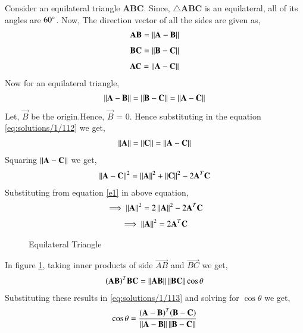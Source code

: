 Consider an equilateral triangle \textbf{ABC}. Since, $\triangle$\textbf{ABC} is an equilateral, all of its angles are $60\degree$. Now, The direction vector of all the sides are given as,
\begin{align}
\mathbf{AB}=\left\lVert\mathbf{A-B}\right\rVert
\end{align}
\begin{align}
\mathbf{BC}=\left\lVert\mathbf{B-C}\right\rVert
\end{align}  
\begin{align}
\mathbf{AC}=\left\lVert\mathbf{A-C}\right\rVert
\end{align} 
Now for an equilateral triangle,
\begin{align}
\left\lVert\mathbf{A-B}\right\rVert = \left\lVert\mathbf{B-C}\right\rVert = \left\lVert\mathbf{A-C}\right\rVert
\label{eq:solutions/1/112}
\end{align}
Let, $\vec{B}$ be the origin.Hence, $\vec{B}$ = 0. Hence substituting in the equation \eqref{eq:solutions/1/112} we get,
\begin{align}
\left\lVert\mathbf{A}\right\rVert = \left\lVert\mathbf{C}\right\rVert =\left\lVert\mathbf{A}-\mathbf{C}\right\rVert
\label{e1}
\end{align}
Squaring $\left\lVert\mathbf{A}-\mathbf{C}\right\rVert$ we get,
\begin{align}
\left\lVert\mathbf{A}-\mathbf{C}\right\rVert^2 = \left\lVert\mathbf{A}\right\rVert^2+\left\lVert\mathbf{C}\right\rVert^2-2\mathbf{A}^T\mathbf{C}
\end{align} 
Substituting from equation \eqref{e1} in above equation, 
\begin{align}
\implies \left\lVert\mathbf{A}\right\rVert^2 = 2\left\lVert\mathbf{A}\right\rVert^2-2\mathbf{A}^T\mathbf{C}
\end{align}
\begin{align}
\implies \left\lVert\mathbf{A}\right\rVert^2 = 2\mathbf{A}^T\mathbf{C}
\label{eq:solutions/1/114}
\end{align}
\begin{figure}[!ht]
\centering
\resizebox{\columnwidth}{!}{}
\caption{Equilateral Triangle}
\label{fig:solutions/1/111}
\end{figure}
In figure \ref{fig:solutions/1/111}, taking inner products of side $\vec{AB}$ and $\vec{BC}$ we get,
\begin{align}
(\mathbf{AB})^T\mathbf{BC} = \left\lVert\mathbf{AB}\right\rVert\left\lVert\mathbf{BC}\right\rVert\cos\theta
\label{eq:solutions/1/113}
\end{align}
Substituting these results in \eqref{eq:solutions/1/113} and solving for $\cos\theta$ we get,
\begin{align}
\cos\theta = \frac{(\mathbf{A}-\mathbf{B})^T(\mathbf{B}-\mathbf{C})}{\left\lVert\mathbf{A}-\mathbf{B}\right\rVert\left\lVert\mathbf{B}-\mathbf{C}\right\rVert}
\end{align}
